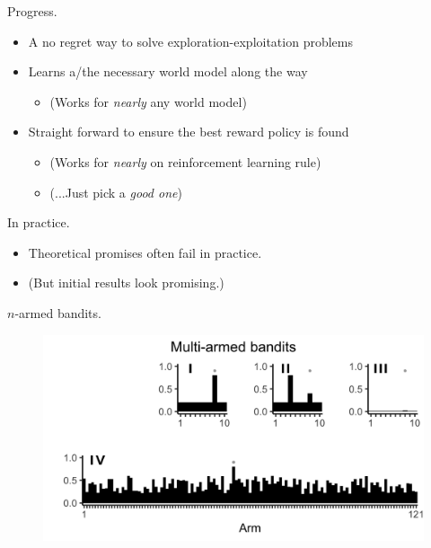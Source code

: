 \documentclass[10pt]{beamer}
\begin{document}
\begin{frame}[fragile]{Progress.}
\begin{itemize}
\item A no regret way to solve exploration-exploitation problems
\item Learns a/the necessary world model along the way
\begin{itemize}
    \item (Works for \textit{nearly} any world model)
\end{itemize}
\item Straight forward to ensure the best reward policy is found
\begin{itemize}
    \item (Works for \textit{nearly} on reinforcement learning rule)
    \item (...Just pick a \textit{good one})
\end{itemize}
\end{itemize}
\end{frame}

\begin{frame}[fragile]{In practice.}
\begin{itemize}
    \item \alert{Theoretical promises often fail in practice.}
    \item (But initial results look promising.)
\end{itemize}
\end{frame}

\begin{frame}[fragile]{$n$-armed bandits.}
\begin{figure}
    \centering
    \includegraphics[scale=0.2]{images/fig2.png}
    \caption{}
\end{figure}
\end{frame}
\end{document}
